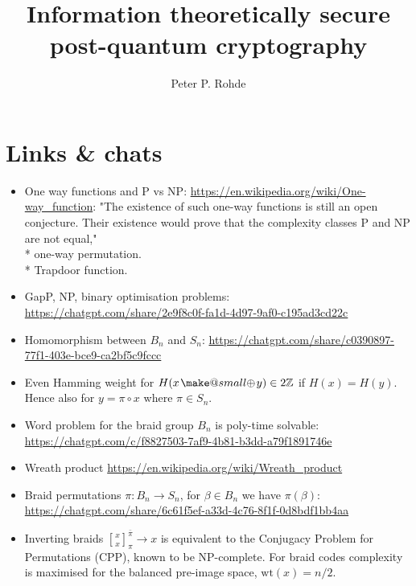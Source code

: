 \documentclass[twocolumn, aps, amsmath, amssymb, nofootinbib, superscriptaddress, longbibliography, doublefloatfix, table-of-contents, eqsecnum, rmp]{revtex4-2}
\makeatletter
\newcommand{\stackbraid}[2]{{\genfrac{[}{]}{0pt}{}{{#1}}{{#2}}}^{\bar{\pi}}_{\pi}}
\newcommand{\soplus}{{{\hspace{1pt}}{\mathbin{\mathpalette\make@small{\mathbin\oplus}}}}{\hspace{1pt}}}
\newcommand{\make@small}[2]{%
  \vcenter{\hbox{%
    \scalebox{0.6}{$\m@th#1#2$}%
  }}%
}
\makeatother
\begin{document}
\title{Information theoretically secure post-quantum cryptography}

\author{Peter P. Rohde}

\begin{abstract}
\end{abstract}

\maketitle

\tableofcontents

\section{Links \& chats}

\begin{itemize}
	\item One way functions and P vs NP: \url{https://en.wikipedia.org/wiki/One-way_function}: "The existence of such one-way functions is still an open conjecture. Their existence would prove that the complexity classes P and NP are not equal,"\\
		* one-way permutation.\\
		* Trapdoor function.\\
	\item GapP, NP, binary optimisation problems: \url{https://chatgpt.com/share/2e9f8c0f-fa1d-4d97-9af0-c195ad3cd22c}
	\item Homomorphism between $B_n$ and $S_n$: \url{https://chatgpt.com/share/c0390897-77f1-403e-bce9-ca2bf5c9fccc}
	\item Even Hamming weight for $H(x\soplus y)\in 2\mathbb{Z}$ if $H(x)=H(y)$. Hence also for $y=\pi\circ x$ where $\pi\in S_n$.
	\item Word problem for the braid group $B_n$ is poly-time solvable: \url{https://chatgpt.com/c/f8827503-7af9-4b81-b3dd-a79f1891746e}
	\item Wreath product \url{https://en.wikipedia.org/wiki/Wreath_product}
	\item Braid permutations \mbox{$\pi: B_n \to S_n$}, for $\beta\in B_n$ we have $\pi(\beta)$: \url{https://chatgpt.com/share/6c61f5ef-a33d-4c76-8f1f-0d8bdf1bb4aa}
	\item Inverting braids $\stackbraid{x}{x}\to x$ is equivalent to the Conjugacy Problem for Permutations (CPP), known to be NP-complete. For braid codes complexity is maximised for the balanced pre-image space, $\mathrm{wt}(x)=n/2$.
\end{itemize}
\end{document}
